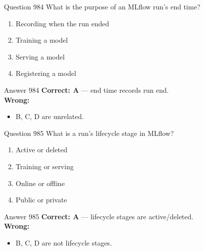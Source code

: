 \documentclass[aspectratio=169,11pt]{beamer}
\begin{document}
	\begin{frame}{Question 984}
		What is the purpose of an MLflow run's end time?
		\begin{enumerate}[label=\Alph*.]
			\item Recording when the run ended
			\item Training a model
			\item Serving a model
			\item Registering a model
		\end{enumerate}
	\end{frame}
	\begin{frame}{Answer 984}
		\textbf{Correct: A} --- end time records run end.\\
		\vspace{0.5em}
		\textbf{Wrong:}
		\begin{itemize}
			\item B, C, D are unrelated.
		\end{itemize}
	\end{frame}
	
	\begin{frame}{Question 985}
		What is a run's lifecycle stage in MLflow?
		\begin{enumerate}[label=\Alph*.]
			\item Active or deleted
			\item Training or serving
			\item Online or offline
			\item Public or private
		\end{enumerate}
	\end{frame}
	\begin{frame}{Answer 985}
		\textbf{Correct: A} --- lifecycle stages are active/deleted.\\
		\vspace{0.5em}
		\textbf{Wrong:}
		\begin{itemize}
			\item B, C, D are not lifecycle stages.
		\end{itemize}
	\end{frame}
	
\end{document}
